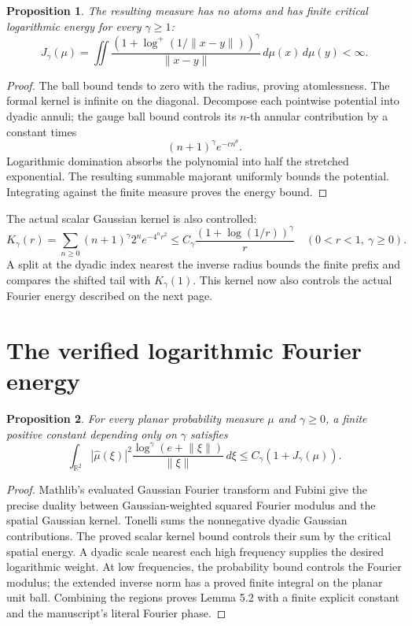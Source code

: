 \documentclass[11pt]{article}
\newtheorem{proposition}{Proposition}
\begin{document}
\begin{proposition}
The resulting measure has no atoms and has finite critical logarithmic energy
for every $\gamma\ge1$:
\[
J_\gamma(\mu)=\iint
\frac{(1+\log^+(1/\lVert x-y\rVert))^\gamma}{\lVert x-y\rVert}
\,d\mu(x)\,d\mu(y)<\infty.
\]
\end{proposition}
\begin{proof}
The ball bound tends to zero with the radius, proving atomlessness. The
formal kernel is infinite on the diagonal. Decompose each pointwise
potential into dyadic annuli; the gauge ball bound controls its $n$-th
annular contribution by a constant times
\[
(n+1)^\gamma e^{-c n^\theta}.
\]
Logarithmic domination absorbs the polynomial into half the stretched
exponential. The resulting summable majorant uniformly bounds the potential.
Integrating against the finite measure proves the energy bound.
\end{proof}

The actual scalar Gaussian kernel is also controlled:
\[
K_\gamma(r)=\sum_{n\ge0}(n+1)^\gamma2^n e^{-4^n r^2}
\le C_\gamma\frac{(1+\log(1/r))^\gamma}{r}
\quad(0<r<1,\ \gamma\ge0).
\]
A split at the dyadic index nearest the inverse radius bounds the finite
prefix and compares the shifted tail with $K_\gamma(1)$. This kernel now
also controls the actual Fourier energy described on the next page.

\newpage
\section*{The verified logarithmic Fourier energy}
\begin{proposition}
For every planar probability measure $\mu$ and $\gamma\ge0$, a finite positive
constant depending only on $\gamma$ satisfies
\[
\int_{\mathbb R^2}|\widehat\mu(\xi)|^2
\frac{\log^\gamma(e+\lVert\xi\rVert)}{\lVert\xi\rVert}\,d\xi
\le C_\gamma(1+J_\gamma(\mu)).
\]
\end{proposition}
\begin{proof}
Mathlib's evaluated Gaussian Fourier transform and Fubini give the precise
duality between Gaussian-weighted squared Fourier modulus and the spatial
Gaussian kernel. Tonelli sums the nonnegative dyadic Gaussian contributions.
The proved scalar kernel bound controls their sum by the critical spatial
energy. A dyadic scale nearest each high frequency supplies the desired
logarithmic weight. At low frequencies, the probability bound controls the
Fourier modulus; the extended inverse norm has a proved finite integral on
the planar unit ball. Combining the regions proves Lemma 5.2 with a finite
explicit constant and the manuscript's literal Fourier phase.
\end{proof}
\end{document}
